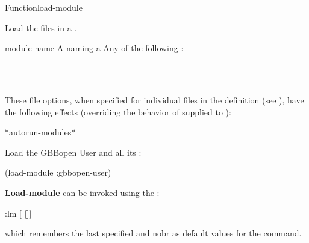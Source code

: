 \documentclass[10pt,twoside,english,pdftex]{article}
\begin{document}

\begin{functiondoc}{Function}{load-module}{
     }
%
% 

\fnsyntax 

\fnpurpose Load the files in a .

\fnpackage {}

\fnmodule {}

\fnargs
\begin{args}{module-name}
 A  naming a 
\arg[option] Any of the following : 
\loadmoduleoptions
\end{args}

\fnerrors 
\modulenotdefined\\
\relativedircircularity\\
\patchesonlymodulenotloaded

\fndescription These file options, when specified for individual files in the
 definition (see ),
have the following effects (overriding the behavior of 
supplied to ):
%
\W\supp\tabletop
\loadmodulefileoptions

\begin{alsos}{*autorun-modules*}
\end{alsos}

\fnexample 
%
Load the GBBopen User  and all its :
%
\W\supp
\begin{example}
  (load-module :gbbopen-user)
\end{example}

\fnnote \textbf{Load-module} can be invoked using the :
%
%
%
\W\supp
\begin{example}
  :lm \textrm{[} \textrm{[}\superstar\textrm{]]}
\end{example}
%
which remembers the last specified  and
nobr{} as default values for the command.

\end{functiondoc}
\end{document}
